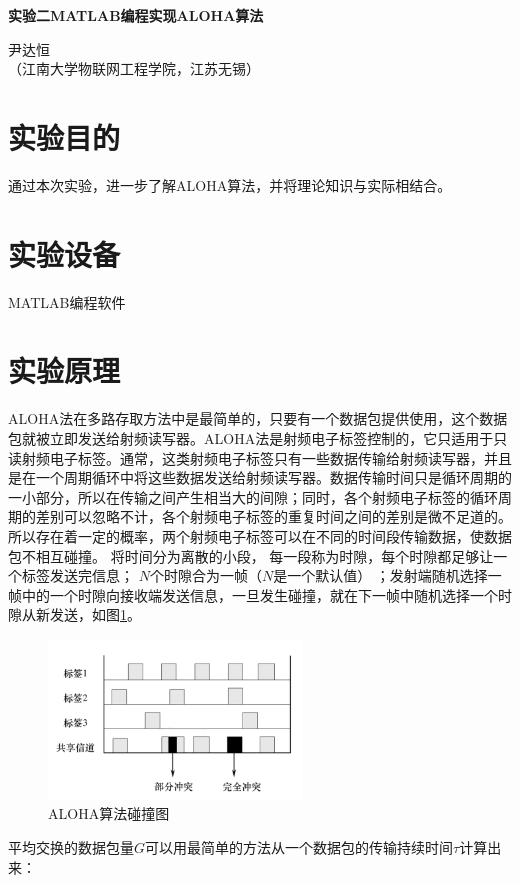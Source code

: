 \documentclass[a4paper]{ctexart}
\begin{document}
\begin{center}
	{\textbf{实验二\quad MATLAB编程实现ALOHA算法}}

	{尹达恒}\\[-1mm]

	{（江南大学物联网工程学院，江苏\quad 无锡）}
\end{center}

\renewcommand{\baselinestretch}{1.3}
\section{实验目的}
通过本次实验，进一步了解ALOHA算法，并将理论知识与实际相结合。

\section{实验设备}
MATLAB编程软件

\section{实验原理}\label{实验原理}
ALOHA法在多路存取方法中是最简单的，只要有一个数据包提供使用，这个数据包就被立即发送给射频读写器。ALOHA法是射频电子标签控制的，它只适用于只读射频电子标签。通常，这类射频电子标签只有一些数据传输给射频读写器，并且是在一个周期循环中将这些数据发送给射频读写器。数据传输时间只是循环周期的一小部分，所以在传输之间产生相当大的间隙；同时，各个射频电子标签的循环周期的差别可以忽略不计，各个射频电子标签的重复时间之间的差别是微不足道的。所以存在着一定的概率，两个射频电子标签可以在不同的时间段传输数据，使数据包不相互碰撞。
将时间分为离散的小段， 每一段称为时隙，每个时隙都足够让一个标签发送完信息； $N$个时隙合为一帧（$N$是一个默认值） ；发射端随机选择一帧中的一个时隙向接收端发送信息，一旦发生碰撞，就在下一帧中随机选择一个时隙从新发送，如图\ref{fig:0}。
\begin{figure}[htbp]
	\centering
	\includegraphics[width=0.6\textwidth]{figure/0.png}
	\caption{ALOHA算法碰撞图}\label{fig:0}
\end{figure}
平均交换的数据包量$G$可以用最简单的方法从一个数据包的传输持续时间$\tau$计算出来：
\end{document}
